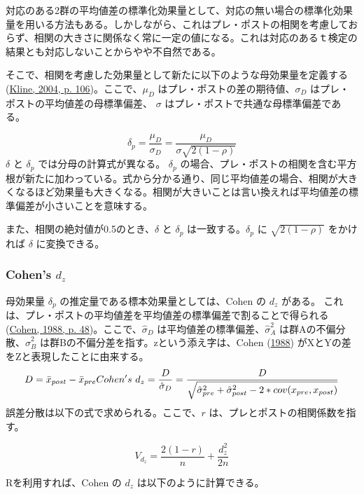 \documentclass[
  ja=standard, xelatex, base=12pt]{bxjsreport}
\newenvironment{Shaded}{\begin{snugshade}}{\end{snugshade}}
\newcommand{\FunctionTok}[1]{\textcolor[rgb]{0.00,0.00,0.00}{#1}}
\newcommand{\NormalTok}[1]{#1}
\newcommand{\SpecialCharTok}[1]{\textcolor[rgb]{0.00,0.00,0.00}{#1}}
\begin{document}
対応のある2群の平均値差の標準化効果量として、対応の無い場合の標準化効果量を用いる方法もある。しかしながら、これはプレ・ポストの相関を考慮しておらず、相関の大きさに関係なく常に一定の値になる。これは対応のあるｔ検定の結果とも対応しないことからやや不自然である。

そこで、相関を考慮した効果量として新たに以下のような母効果量を定義する(\protect\hyperlink{ref-kline2004}{Kline, 2004, p. 106})。ここで、\(\mu_{D}\) はプレ・ポストの差の期待値、\(σ_D\) はプレ・ポストの平均値差の母標準偏差、 \(σ\) はプレ・ポストで共通な母標準偏差である。

\[
\delta_p=\frac{\mu_{D}}{\sigma_D}=\frac{\mu_{D}}{\sigma\sqrt{2(1-\rho)}}
\] \(\delta\) と \(\delta_p\) では分母の計算式が異なる。 \(\delta_p\) の場合、プレ・ポストの相関を含む平方根が新たに加わっている。式から分かる通り、同じ平均値差の場合、相関が大きくなるほど効果量も大きくなる。相関が大きいことは言い換えれば平均値差の標準偏差が小さいことを意味する。

また、相関の絶対値が0.5のとき、\(\delta\) と \(\delta_p\) は一致する。\(\delta_p\) に \(\sqrt{2(1-\rho)}\) をかければ \(\delta\) に変換できる。

\hypertarget{cohens-d_z-1}{%
\subsubsection{\texorpdfstring{Cohen's \(d_z\)}{Cohen's d\_z}}\label{cohens-d_z-1}}

母効果量 \(\delta_p\) の推定量である標本効果量としては、Cohen の \(d_z\) がある。 これは、プレ・ポストの平均値差を平均値差の標準偏差で割ることで得られる(\protect\hyperlink{ref-cohen1988}{Cohen, 1988, p. 48})。ここで、\(\hat\sigma_D\) は平均値差の標準偏差、\(\hat\sigma_A^2\) は群Aの不偏分散、\(\hat\sigma_B^2\) は群Bの不偏分差を指す。zという添え字は、Cohen (\protect\hyperlink{ref-cohen1988}{1988}) がXとYの差をZと表現したことに由来する。 \[
D=\bar{x}_{post}-\bar{x}_{pre}\\
Cohen's~d_z=\frac{D}{\hat\sigma_D}=\frac{D}{\sqrt{\hat\sigma_{pre}^2+\hat\sigma_{post}^2-2*cov(x_{pre}, x_{post})}}
\] 誤差分散は以下の式で求められる。ここで、\(r\) は、プレとポストの相関係数を指す。

\[
V_{d_z} = \dfrac{2(1-r)}{n}+\frac{d_z^2}{2n}
\]

Rを利用すれば、Cohen の \(d_z\) は以下のように計算できる。

\begin{Shaded}
\end{Shaded}
\end{document}
